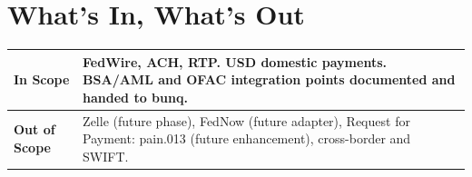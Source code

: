 
\section{What's In, What's Out}

\begin{tabularx}{\textwidth}{@{}l X@{}}
\toprule
\textbf{In Scope} & FedWire, ACH, RTP. USD domestic payments. BSA/AML and OFAC integration points documented and handed to bunq. \\
\midrule
\textbf{Out of Scope} & Zelle (future phase), FedNow (future adapter), Request for Payment: pain.013 (future enhancement), cross-border and SWIFT. \\
\bottomrule
\end{tabularx}
